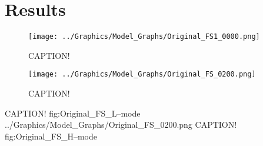 \chapter{Results}\label{chapter:results}

\begin{figure}[tb]
	\centering
	\texttt{[image: ../Graphics/Model\_Graphs/Original\_FS1\_0000.png]}
	\caption{CAPTION!}
	\label{fig:Original_FS_L--mode}
\end{figure}
\begin{figure}[tb]
	\centering
	\texttt{[image: ../Graphics/Model\_Graphs/Original\_FS\_0200.png]}
	\caption{CAPTION!}
	\label{fig:Original_FS_H--mode}
\end{figure}

	{CAPTION!}
	{fig:Original_FS_L--mode}
	{../Graphics/Model_Graphs/Original_FS_0200.png}
	{CAPTION!}
	{fig:Original_FS_H--mode}

